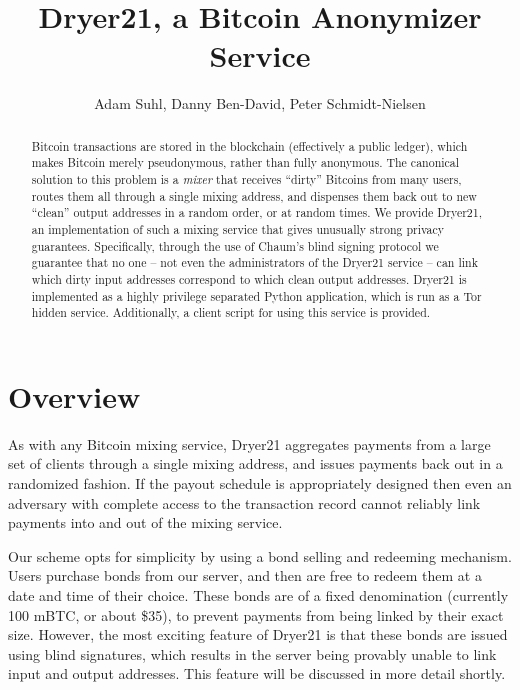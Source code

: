 \documentclass[12pt]{article}
\title{Dryer21, a Bitcoin Anonymizer Service}
\author{Adam Suhl, Danny Ben-David, Peter Schmidt-Nielsen}
\begin{document}
\maketitle
\begin{abstract}
Bitcoin transactions are stored in the blockchain (effectively a public ledger), which makes Bitcoin merely pseudonymous, rather than fully anonymous.
The canonical solution to this problem is a \emph{mixer} that receives ``dirty'' Bitcoins from many users, routes them all through a single mixing address, and dispenses them back out to new ``clean'' output addresses in a random order, or at random times.
We provide Dryer21, an implementation of such a mixing service that gives unusually strong privacy guarantees.
Specifically, through the use of Chaum's blind signing protocol we guarantee that no one -- not even the administrators of the Dryer21 service -- can link which dirty input addresses correspond to which clean output addresses.
Dryer21 is implemented as a highly privilege separated Python application, which is run as a Tor hidden service.
Additionally, a client script for using this service is provided.
\end{abstract}

\section{Overview}
As with any Bitcoin mixing service, Dryer21 aggregates payments from a large set of clients through a single mixing address, and issues payments back out in a randomized fashion.
If the payout schedule is appropriately designed then even an adversary with complete access to the transaction record cannot reliably link payments into and out of the mixing service.

Our scheme opts for simplicity by using a bond selling and redeeming mechanism.
Users purchase bonds from our server, and then are free to redeem them at a date and time of their choice.
These bonds are of a fixed denomination (currently 100 mBTC, or about \$35), to prevent payments from being linked by their exact size.
However, the most exciting feature of Dryer21 is that these bonds are issued using blind signatures, which results in the server being provably unable to link input and output addresses.
This feature will be discussed in more detail shortly.
\end{document}
